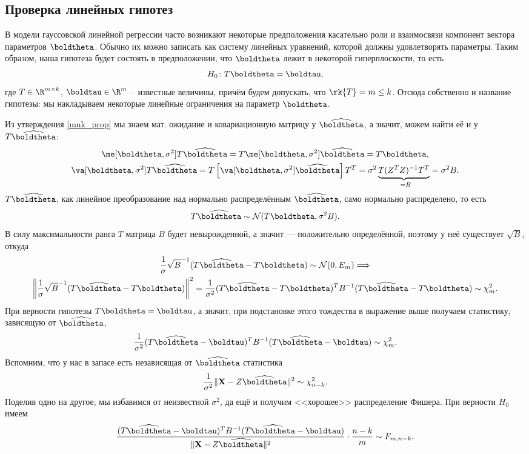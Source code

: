 \subsection{Проверка линейных гипотез}

В модели гауссовской линейной регрессии часто возникают некоторые предположения касательно роли и взаимосвязи компонент вектора параметров $\boldtheta$. Обычно их можно записать как систему линейных уравнений, которой должны удовлетворять параметры. Таким образом, наша гипотеза будет состоять в предположении, что $\boldtheta$ лежит в некоторой гиперплоскости, то есть 
\[
H_0\colon T\boldtheta = \boldtau,
\]
где $T\in\R^{m \times k}$, $\boldtau \in \R^m$ -- известные величины, причём будем допускать, что $\rk{T} = m \le k$. Отсюда собственно и название гипотезы: мы накладываем некоторые линейные ограничения на параметр $\boldtheta$.

Из утверждения \ref{mnk_prop} мы знаем мат. ожидание и ковариационную матрицу у $\widehat{\boldtheta}$, а значит, можем найти её и у $T\widehat{\boldtheta}$:
\begin{gather*}
    \me[\boldtheta, \sigma^2] T\widehat{\boldtheta} = T\me[\boldtheta, \sigma^2] \widehat{\boldtheta} = T\boldtheta,\\
    \va[\boldtheta, \sigma^2] T\widehat{\boldtheta} = T \left[\va[\boldtheta, \sigma^2] \widehat{\boldtheta}\right] T^T = \sigma^2 \underbrace{T (Z^T Z)^{-1} T^T}_{\phantom{0}=B} = \sigma^2 B.
\end{gather*}
$T\widehat{\boldtheta}$, как линейное преобразование над нормально распределённым $\widehat{\boldtheta}$, само нормально распределено, то есть
\[
T\widehat{\boldtheta} \sim \mathcal{N}(T\boldtheta, \sigma^2 B).
\]
В силу максимальности ранга $T$ матрица $B$ будет невырожденной, а значит --- положительно определённой, поэтому у неё существует $\sqrt{B}$, откуда
\begin{gather*}
    \frac{1}{\sigma} \sqrt{B}^{-1} (T\widehat{\boldtheta} - T\boldtheta) \sim \mathcal{N}(0, E_m) \Longrightarrow\\
    \left\|\frac{1}{\sigma} \sqrt{B}^{-1} (T\widehat{\boldtheta} - T\boldtheta)\right\|^2 = \frac{1}{\sigma^2}(T\widehat{\boldtheta} - T\boldtheta)^T B^{-1} (T\widehat{\boldtheta} - T\boldtheta) \sim \chi^2_m.
\end{gather*}
При верности гипотезы $T\boldtheta = \boldtau$, а значит, при подстановке этого тождества в выражение выше получаем статистику, зависящую от $\widehat{\boldtheta}$,
\[
\frac{1}{\sigma^2}(T\widehat{\boldtheta} - \boldtau)^T B^{-1} (T\widehat{\boldtheta} - \boldtau) \sim \chi^2_m.
\]
Вспомним, что у нас в запасе есть независящая от $\widehat{\boldtheta}$ статистика
\[
\frac{1}{\sigma^2} \|\mathbf X - Z \widehat{\boldtheta}\|^2 \sim \chi^2_{n-k}.
\]
Поделив одно на другое, мы избавимся от неизвестной $\sigma^2$, да ещё и получим <<хорошее>> распределение Фишера. При верности $H_0$ имеем
\[
\frac{(T\widehat{\boldtheta} - \boldtau)^T B^{-1} (T\widehat{\boldtheta} - \boldtau)}{\|\mathbf X - Z \widehat{\boldtheta}\|^2}\cdot \frac{n - k}{m} \sim F_{m, n-k}.
\]

